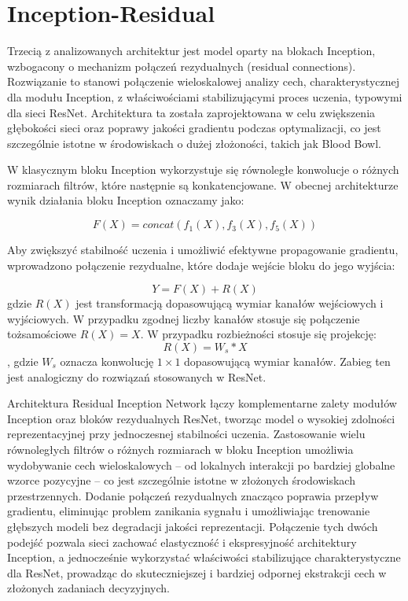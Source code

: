 \section{Inception-Residual}
Trzecią z analizowanych architektur jest model oparty na blokach Inception, wzbogacony o mechanizm połączeń rezydualnych (residual connections). Rozwiązanie to stanowi połączenie wieloskalowej analizy cech, charakterystycznej dla modułu Inception, z właściwościami stabilizującymi proces uczenia, typowymi dla sieci ResNet. Architektura ta została zaprojektowana w celu zwiększenia głębokości sieci oraz poprawy jakości gradientu podczas optymalizacji, co jest szczególnie istotne w środowiskach o dużej złożoności, takich jak Blood Bowl.

W klasycznym bloku Inception wykorzystuje się równoległe konwolucje o różnych rozmiarach filtrów, które następnie są konkatencjowane. W obecnej architekturze wynik działania bloku Inception oznaczamy jako:

\[F(X)=concat(f_1(X),f_3(X),f_5(X))\]

Aby zwiększyć stabilność uczenia i umożliwić efektywne propagowanie gradientu, wprowadzono połączenie rezydualne, które dodaje wejście bloku do jego wyjścia:

\[Y = F(X) + R(X)\]
gdzie $R(X)$ jest transformacją dopasowującą wymiar kanałów wejściowych i wyjściowych. W przypadku zgodnej liczby kanałów stosuje się połączenie tożsamościowe $R(X) = X$. W przypadku rozbieżności stosuje się projekcję:
\[R(X) = W_s*X\],
gdzie $W_s$ oznacza konwolucję $1\times1$ dopasowującą wymiar kanałów. Zabieg ten jest analogiczny do rozwiązań stosowanych w ResNet.

Architektura Residual Inception Network łączy komplementarne zalety modułów Inception oraz bloków rezydualnych ResNet, tworząc model o wysokiej zdolności reprezentacyjnej przy jednoczesnej stabilności uczenia. Zastosowanie wielu równoległych filtrów o różnych rozmiarach w bloku Inception umożliwia wydobywanie cech wieloskalowych – od lokalnych interakcji po bardziej globalne wzorce pozycyjne – co jest szczególnie istotne w złożonych środowiskach przestrzennych. Dodanie połączeń rezydualnych znacząco poprawia przepływ gradientu, eliminując problem zanikania sygnału i umożliwiając trenowanie głębszych modeli bez degradacji jakości reprezentacji. Połączenie tych dwóch podejść pozwala sieci zachować elastyczność i ekspresyjność architektury Inception, a jednocześnie wykorzystać właściwości stabilizujące charakterystyczne dla ResNet, prowadząc do skuteczniejszej i bardziej odpornej ekstrakcji cech w złożonych zadaniach decyzyjnych.

